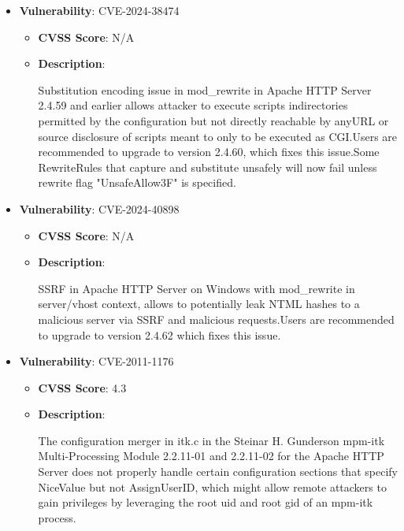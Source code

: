 \documentclass{article}
\begin{document}
\begin{itemize}
        \item \textbf{Vulnerability}: CVE-2024-38474
        \begin{itemize}
            \item \textbf{CVSS Score}:  N/A 
            \item \textbf{Description}:
            \parbox[t]{0.9\linewidth}{
                \ttfamily Substitution encoding issue in mod\_rewrite in Apache HTTP Server 2.4.59 and earlier allows attacker to execute scripts indirectories permitted by the configuration but not directly reachable by anyURL or source disclosure of scripts meant to only to be executed as CGI.Users are recommended to upgrade to version 2.4.60, which fixes this issue.Some RewriteRules that capture and substitute unsafely will now fail unless rewrite flag "UnsafeAllow3F" is specified.
            }
        \end{itemize}
    
        \item \textbf{Vulnerability}: CVE-2024-40898
        \begin{itemize}
            \item \textbf{CVSS Score}:  N/A 
            \item \textbf{Description}:
            \parbox[t]{0.9\linewidth}{
                \ttfamily SSRF in Apache HTTP Server on Windows with mod\_rewrite in server/vhost context, allows to potentially leak NTML hashes to a malicious server via SSRF and malicious requests.Users are recommended to upgrade to version 2.4.62 which fixes this issue.
            }
        \end{itemize}
    
        \item \textbf{Vulnerability}: CVE-2011-1176
        \begin{itemize}
            \item \textbf{CVSS Score}:  4.3 
            \item \textbf{Description}:
            \parbox[t]{0.9\linewidth}{
                \ttfamily The configuration merger in itk.c in the Steinar H. Gunderson mpm-itk Multi-Processing Module 2.2.11-01 and 2.2.11-02 for the Apache HTTP Server does not properly handle certain configuration sections that specify NiceValue but not AssignUserID, which might allow remote attackers to gain privileges by leveraging the root uid and root gid of an mpm-itk process.
            }
        \end{itemize}
    

\end{itemize}
\end{document}
